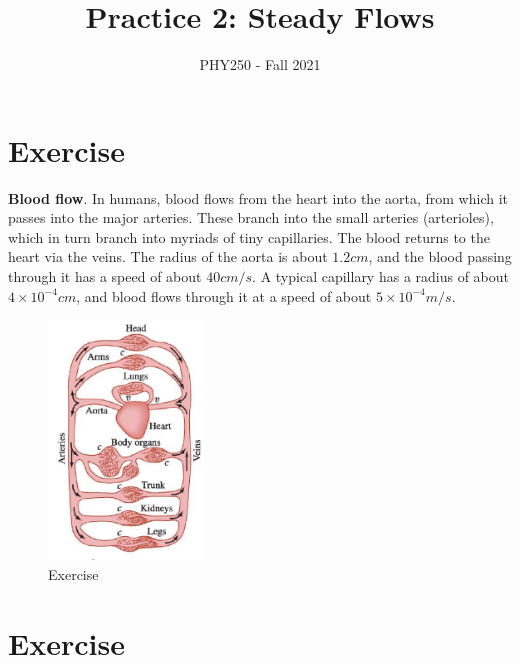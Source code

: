 \documentclass[12pt]{article}
\title{Practice 2: Steady Flows}
\author{PHY250 - Fall 2021}
\date{}
\begin{document}
\maketitle






\setcounter{example}{1}

\section*{Exercise \theexample}

\textbf{Blood flow}. In humans, blood flows from the heart into the aorta, from which it passes into the major arteries. These branch into the small arteries (arterioles),
 which in turn branch into myriads of tiny capillaries. The blood returns to the heart via the veins. The radius of the aorta is about $1.2 cm$, and the blood passing through it has 
a speed of about $40 cm/s$. A typical capillary has a radius of about $4 \times 10^{-4} cm$, and blood flows through it at a speed of about $5 \times 10^ {-4} m/s$. 


\vspace{5mm}

\begin{figure}[h!]
    \begin{center}
      \includegraphics[height=2.5in]{images/hb.jpg}
      \caption{Exercise \theexample }
      \label{1}
    \end{center}
  \end{figure}


\section*{Exercise \theexample}
\end{document}
